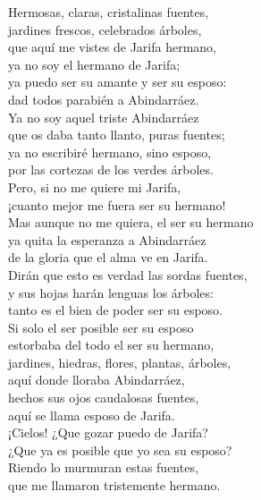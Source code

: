 \begin{exe}
	\ex\label{ex:sextina}Hermosas, claras, cristalinas fuentes,\\			
		jardines frescos, celebrados árboles,\\
		que aquí me vistes de Jarifa hermano,\\
		ya no soy el hermano de Jarifa;\\
		ya puedo ser su amante y ser su esposo:\\
		dad todos parabién a Abindarráez.\vspace{.333\baselineskip}\\			
		Ya no soy aquel triste Abindarráez\\
		que os daba tanto llanto, puras fuentes;\\
		ya no escribiré hermano, sino esposo,\\
		por las cortezas de los verdes árboles.\\
		Pero, si no me quiere mi Jarifa,\\				
		¡cuanto mejor me fuera ser su hermano!\vspace{.333\baselineskip}\\
		Mas aunque no me quiera, el ser su hermano\\
		ya quita la esperanza a Abindarráez\\
		de la gloria que el alma ve en Jarifa.\\
		Dirán que esto es verdad las sordas fuentes,\\			
		y sus hojas harán lenguas los árboles:\\
		tanto es el bien de poder ser su esposo.\vspace{.333\baselineskip}\\
		Si solo el ser posible ser su esposo\\
		estorbaba del todo el ser su hermano,\\
		jardines, hiedras, flores, plantas, árboles,\\
		aquí donde lloraba Abindarráez,\\
		hechos sus ojos caudalosas fuentes,\\
		aquí se llama esposo de Jarifa.\vspace{.333\baselineskip}\\
		¡Cielos! ¿Que gozar puedo de Jarifa?\\
		¿Que ya es posible que yo sea su esposo?\\
		Riendo lo murmuran estas fuentes,\\
		que me llamaron tristemente hermano.\\

\end{exe}
